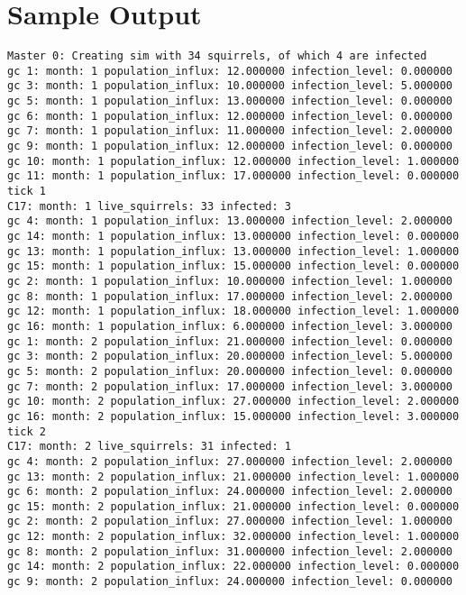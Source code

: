 \appendix
\section{Sample Output}\label{sec:sample}
\begin{lstlisting}[basicstyle=\small]
Master 0: Creating sim with 34 squirrels, of which 4 are infected
gc 1: month: 1 population_influx: 12.000000 infection_level: 0.000000
gc 3: month: 1 population_influx: 10.000000 infection_level: 5.000000
gc 5: month: 1 population_influx: 13.000000 infection_level: 0.000000
gc 6: month: 1 population_influx: 12.000000 infection_level: 0.000000
gc 7: month: 1 population_influx: 11.000000 infection_level: 2.000000
gc 9: month: 1 population_influx: 12.000000 infection_level: 0.000000
gc 10: month: 1 population_influx: 12.000000 infection_level: 1.000000
gc 11: month: 1 population_influx: 17.000000 infection_level: 0.000000
tick 1
C17: month: 1 live_squirrels: 33 infected: 3
gc 4: month: 1 population_influx: 13.000000 infection_level: 2.000000
gc 14: month: 1 population_influx: 13.000000 infection_level: 0.000000
gc 13: month: 1 population_influx: 13.000000 infection_level: 1.000000
gc 15: month: 1 population_influx: 15.000000 infection_level: 0.000000
gc 2: month: 1 population_influx: 10.000000 infection_level: 1.000000
gc 8: month: 1 population_influx: 17.000000 infection_level: 2.000000
gc 12: month: 1 population_influx: 18.000000 infection_level: 1.000000
gc 16: month: 1 population_influx: 6.000000 infection_level: 3.000000
gc 1: month: 2 population_influx: 21.000000 infection_level: 0.000000
gc 3: month: 2 population_influx: 20.000000 infection_level: 5.000000
gc 5: month: 2 population_influx: 20.000000 infection_level: 0.000000
gc 7: month: 2 population_influx: 17.000000 infection_level: 3.000000
gc 10: month: 2 population_influx: 27.000000 infection_level: 2.000000
gc 16: month: 2 population_influx: 15.000000 infection_level: 3.000000
tick 2
C17: month: 2 live_squirrels: 31 infected: 1
gc 4: month: 2 population_influx: 27.000000 infection_level: 2.000000
gc 13: month: 2 population_influx: 21.000000 infection_level: 1.000000
gc 6: month: 2 population_influx: 24.000000 infection_level: 2.000000
gc 15: month: 2 population_influx: 21.000000 infection_level: 0.000000
gc 2: month: 2 population_influx: 27.000000 infection_level: 1.000000
gc 12: month: 2 population_influx: 32.000000 infection_level: 1.000000
gc 8: month: 2 population_influx: 31.000000 infection_level: 2.000000
gc 14: month: 2 population_influx: 22.000000 infection_level: 0.000000
gc 9: month: 2 population_influx: 24.000000 infection_level: 0.000000

\end{lstlisting}
